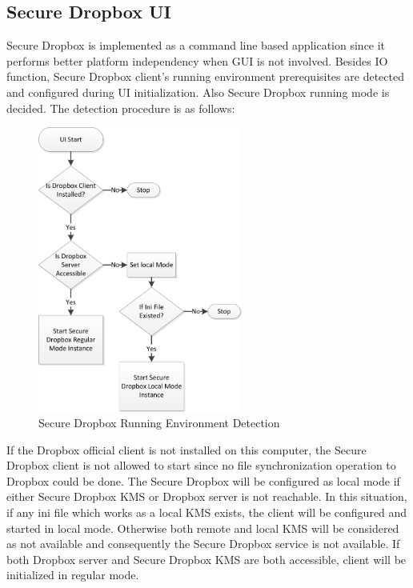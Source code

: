 \subsection{Secure Dropbox UI}

Secure Dropbox is implemented as a command line based application since it performs better platform independency when GUI is not involved. Besides IO function, Secure Dropbox client’s running environment prerequisites are detected and configured during UI initialization. Also Secure Dropbox running mode is decided. The detection procedure is as follows:

\begin{figure}[h]
        \centering
        \includegraphics[width=0.6\textwidth]{figures/Secure_Dropbox_Running_Environment_Detection.png}
        \caption[Running Environment Detection] {Secure Dropbox Running Environment Detection}
\end{figure}

If the Dropbox official client is not installed on this computer, the Secure Dropbox client is not allowed to start since no file synchronization operation to Dropbox could be done. The Secure Dropbox will be configured as local mode if either Secure Dropbox KMS or Dropbox server is not reachable. In this situation, if any ini file which works as a local KMS exists, the client will be configured and started in local mode. Otherwise both remote and local KMS will be considered as not available and consequently the Secure Dropbox service is not available. If both Dropbox server and Secure Dropbox KMS are both accessible, client will be initialized in regular mode.

